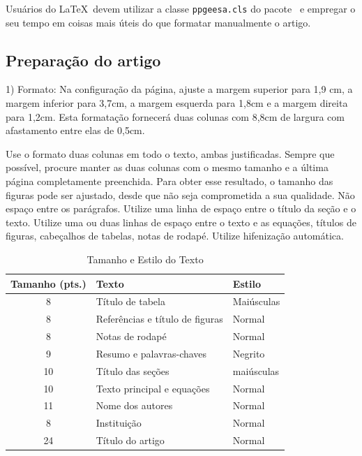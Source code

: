 \documentclass{ppgeesa}
\begin{document}
Usuários do \LaTeX\ devem utilizar a classe {\tt ppgeesa.cls} do pacote
\DeLaeTeX\ e empregar o seu tempo em coisas mais úteis do que formatar
manualmente o artigo.

\subsection{Preparação do artigo}

1) Formato: Na configuração da página, ajuste a margem superior  para  1,9
cm, a margem inferior para 3,7cm, a margem esquerda para 1,8cm e a margem
direita para 1,2cm. Esta formatação fornecerá duas colunas com 8,8cm de
largura com afastamento entre elas de 0,5cm.

Use o formato duas colunas em todo o texto, ambas justificadas. Sempre que
possível, procure manter as duas colunas com o mesmo tamanho e a última
página completamente preenchida. Para obter esse resultado, o tamanho das
figuras pode ser ajustado, desde que não seja comprometida a sua qualidade.
Não espaço entre os parágrafos. Utilize uma linha de espaço entre o título
da seção e o texto. Utilize uma ou duas linhas de espaço entre o texto e as
equações, títulos de figuras, cabeçalhos de tabelas, notas de rodapé. 
Utilize hifenização automática.

\begin{table}[htbp]
\begin{center}
\caption{Tamanho e Estilo do Texto}
\begin{small}
\begin{tabular}{cll}
\hline
Tamanho (pts.) & Texto & Estilo\\
\hline
8  & Título de tabela & Maiúsculas\\
8  & Referências e título de figuras & Normal\\
8  & Notas de rodapé & Normal\\
9  & Resumo e palavras-chaves & Negrito\\
10 & Título das seções & maiúsculas\\
10 & Texto principal e equações & Normal\\
11 & Nome dos autores & Normal\\
8  & Instituição & Normal\\
24 & Título do artigo & Normal\\
\hline
\end{tabular}
\end{small}
\end{center}
\end{table}
\end{document}

